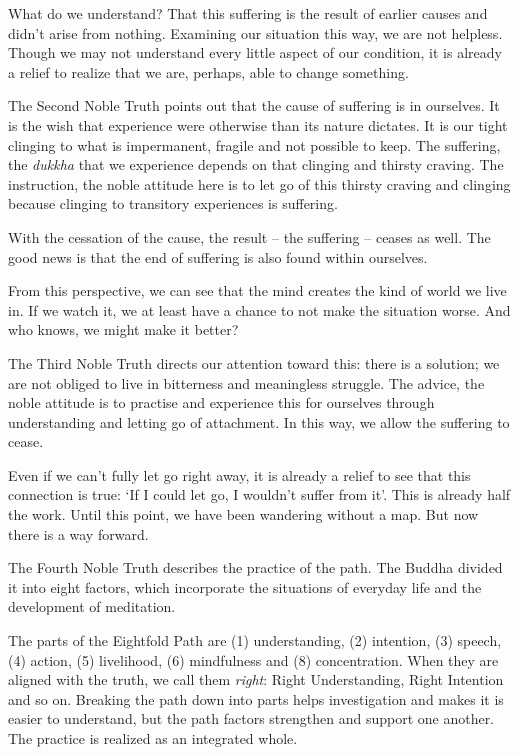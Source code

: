What do we understand? That this suffering is the result of earlier
causes and didn't arise from nothing. Examining our situation this way,
we are not helpless. Though we may not understand every little aspect of
our condition, it is already a relief to realize that we are, perhaps,
able to change something.

The Second Noble Truth points out that the cause of suffering is in
ourselves. It is the wish that experience were otherwise than its nature
dictates. It is our tight clinging to what is impermanent, fragile and
not possible to keep. The suffering, the \emph{dukkha} that we
experience depends on that clinging and thirsty craving. The
instruction, the noble attitude here is to let go of this thirsty
craving and clinging because clinging to transitory experiences is
suffering.


With the cessation of the cause, the result -- the suffering -- ceases
as well. The good news is that the end of suffering is also found within
ourselves.

From this perspective, we can see that the mind creates the kind of
world we live in. If we watch it, we at least have a chance to not make
the situation worse. And who knows, we might make it better?

The Third Noble Truth directs our attention toward this: there is a
solution; we are not obliged to live in bitterness and meaningless
struggle. The advice, the noble attitude is to practise and experience
this for ourselves through understanding and letting go of attachment.
In this way, we allow the suffering to cease.

Even if we can't fully let go right away, it is already a relief to see
that this connection is true: `If I could let go, I wouldn't suffer from
it'. This is already half the work. Until this point, we have been
wandering without a map. But now there is a way forward.


The Fourth Noble Truth describes the practice of the path. The Buddha
divided it into eight factors, which incorporate the situations of
everyday life and the development of meditation.

The parts of the Eightfold Path are (1) understanding, (2) intention,
(3) speech, (4) action, (5) livelihood, (6) mindfulness and (8)
concentration. When they are aligned with the truth, we call them
\emph{right}: Right Understanding, Right Intention and so on. Breaking
the path down into parts helps investigation and makes it is easier to
understand, but the path factors strengthen and support one another. The
practice is realized as an integrated whole.

